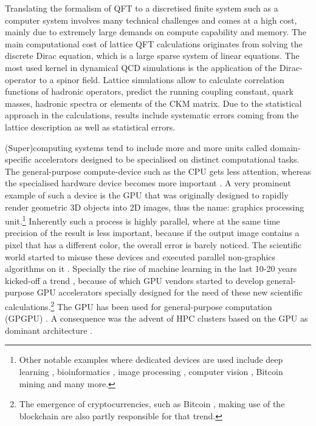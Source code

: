 \documentclass{article}
\theoremstyle{plain} %
\theoremstyle{convention} %
\theoremstyle{remark} %
\numberwithin{equation}{section}
\begin{document}
Translating the formalism of QFT to a discretised finite system such as a computer system involves many technical challenges and comes at a high cost, mainly due to extremely large demands on compute capability and memory. The main computational cost of lattice QFT calculations originates from solving the discrete Dirac equation, which is a large sparse system of linear equations. The most used kernel in dynamical QCD simulations is the application of the Dirac-operator to a spinor field. Lattice simulations allow to calculate correlation functions of hadronic operators, predict the running coupling constant, quark masses, hadronic spectra or elements of the CKM matrix. Due to the statistical approach in the calculations, results include systematic errors coming from the lattice description as well as statistical errors.

(Super)computing systems tend to include more and more units called domain-specific accelerators \cite{cong2010} designed to be specialised on distinct computational tasks. The general-purpose compute-device such as the CPU gets less attention, whereas the specialised hardware device becomes more important \cite{pan2018}. A very prominent example of such a device is the GPU that was originally designed to rapidly render geometric 3D objects into 2D images, thus the name: graphics processing unit.\footnote{Other notable examples where dedicated devices are used include deep learning \cite{tpu,han2016}, bioinformatics \cite{turakhia2018}, image processing \cite{qadeer2013}, computer vision \cite{sun2018,fung2004}, Bitcoin mining \cite{satoh2007} and many more.} Inherently such a process is highly parallel, where at the same time precision of the result is less important, because if the output image contains a pixel that has a different color, the overall error is barely noticed. The scientific world started to misuse these devices and executed parallel non-graphics algorithms on it \cite{brodtkorb2013}. Specially the rise of machine learning in the last \num{10}-\num{20} years kicked-off a trend \cite{steinkraus2005}, because of which GPU vendors started to develop general-purpose GPU accelerators specially designed for the need of these new scientific calculations.\footnote{The emergence of cryptocurrencies, such as Bitcoin \cite{nakamoto2019}, making use of the blockchain are also partly responsible for that trend.} The GPU has been used for general-purpose computation (GPGPU) \cite{luebke2004}. A consequence was the advent of HPC clusters based on the GPU as dominant architecture \cite{kindratenko2011}.
\end{document}
